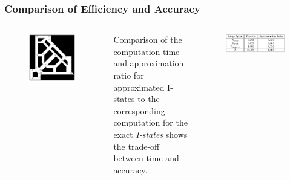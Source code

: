\documentclass[compress]{beamer}
\begin{document}
\begin{frame}\frametitle{Comparison of Efficiency and Accuracy}
\begin{columns}
    \begin{figure}
    \includegraphics[scale=0.3]{office.jpg}
    \end{figure}
Comparison of the computation time and approximation ratio for approximated I-states
    to the corresponding computation for the exact \emph{I-states} shows
    the trade-off between time and accuracy.

    \begin{figure}
    \includegraphics[scale=0.25]{tab1.jpg}
    \end{figure}


\end{columns}
\end{frame}
\end{document}
